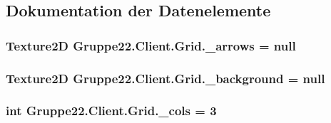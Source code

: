 \subsection{Dokumentation der Datenelemente}
\hypertarget{class_gruppe22_1_1_client_1_1_grid_a737100c39b0ba0d03c8d0dd449785de7}{
\subsubsection[{\-\_\-arrows}]{\setlength{\rightskip}{0pt plus 5cm}Texture2\-D Gruppe22.\-Client.\-Grid.\-\_\-arrows = null\hspace{0.3cm}{\ttfamily [protected]}}}\label{class_gruppe22_1_1_client_1_1_grid_a737100c39b0ba0d03c8d0dd449785de7}
\hypertarget{class_gruppe22_1_1_client_1_1_grid_a260c6d7278902345b592e52ca0da4307}{
\subsubsection[{\-\_\-background}]{\setlength{\rightskip}{0pt plus 5cm}Texture2\-D Gruppe22.\-Client.\-Grid.\-\_\-background = null\hspace{0.3cm}{\ttfamily [protected]}}}\label{class_gruppe22_1_1_client_1_1_grid_a260c6d7278902345b592e52ca0da4307}
\hypertarget{class_gruppe22_1_1_client_1_1_grid_a5287cb3e2ed085ccfd851f3191b2a765}{
\subsubsection[{\-\_\-cols}]{\setlength{\rightskip}{0pt plus 5cm}int Gruppe22.\-Client.\-Grid.\-\_\-cols = 3\hspace{0.3cm}{\ttfamily [protected]}}}\label{class_gruppe22_1_1_client_1_1_grid_a5287cb3e2ed085ccfd851f3191b2a765}




